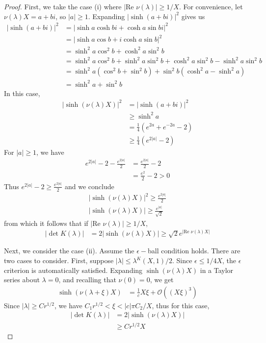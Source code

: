 \documentclass[thesis.tex]{subfiles}
\begin{document}
\begin{lemma}
\begin{proof}
First, we take the case (i) where $|\text{Re }\nu(\lambda)| \geq 1/X$. For convenience, let $\nu(\lambda)X = a + bi$, so $|a| \geq 1$. Expanding $|\sinh(a + b i)|^2$ gives us
\begin{align*}
|\sinh(a + b i)|^2 
&= |\sinh a \cosh b i + \cosh a \sin b i|^2 \\
&= |\sinh a \cos b + i \cosh a \sin b |^2 \\
&= \sinh^2 a \cos^2 b + \cosh^2 a \sin^2 b \\
&= \sinh^2 a \cos^2 b + \sinh^2 a \sin^2 b 
+ \cosh^2 a \sin^2 b - \sinh^2 a \sin^2 b \\
&= \sinh^2 a (\cos^2 b + \sin^2 b) 
+ \sin^2 b( \cosh^2 a - \sinh^2 a) \\
&= \sinh^2 a + \sin^2 b
\end{align*}
In this case,
\begin{align*}
|\sinh(\nu(\lambda) X)|^2 &= |\sinh(a + b i)|^2 \\
&\geq \sinh^2 a \\
&= \frac{1}{4}\left( e^{2a} + e^{-2a} - 2 \right) \\
&\geq \frac{1}{4}\left( e^{2|a|} - 2 \right)
\end{align*}
For $|a| \geq 1$, we have
\begin{align*}
e^{2|a|} - 2 - \frac{e^{2|a|}}{2} 
&= \frac{e^{2|a|}}{2} - 2 \\
&= \frac{e^2}{2} - 2 > 0
\end{align*}
Thus $e^{2|a|} - 2 \geq \frac{e^{2|a|}}{2}$ and we conclude
\begin{align*}
|\sinh(\nu(\lambda) X)|^2 \geq \frac{e^{2|a|}}{2} \\
|\sinh(\nu(\lambda) X)| \geq \frac{e^{|a|}}{\sqrt{2}}
\end{align*}
from which it follows that if $|\text{Re } \nu(\lambda)| \geq 1/X$,
\begin{align*}
|\det K(\lambda)| &= 2 |\sinh(\nu(\lambda) X)|
\geq \sqrt{2} e^{|\text{Re }\nu(\lambda)X|}
\end{align*}

Next, we consider the case (ii). Assume the $\epsilon-$ball condition holds. There are two cases to consider. First, suppose $|\lambda| \leq \lambda^K(X,1)/2$. Since $\epsilon \leq 1/4X$, the $\epsilon$ criterion is automatically satisfied. Expanding $\sinh( \nu(\lambda) X)$ in a Taylor series about $\lambda = 0$, and recalling that $\nu(0) = 0$, we get
\begin{align*}
\sinh(\nu(\lambda + \xi) X) &= \frac{1}{c}X\xi + \mathcal{O}((X \xi)^3)
\end{align*}
Since $|\lambda| \geq C r^{1/2}$, we have $C_1 r^{1/2} < \xi < |c| \pi C_2/X$, thus for this case,
\begin{align*}
|\det K(\lambda)| &= 2 |\sinh(\nu(\lambda) X)| \\
& \geq C r^{1/2}X
\end{align*}


\end{proof}
\end{lemma}
\end{document}

